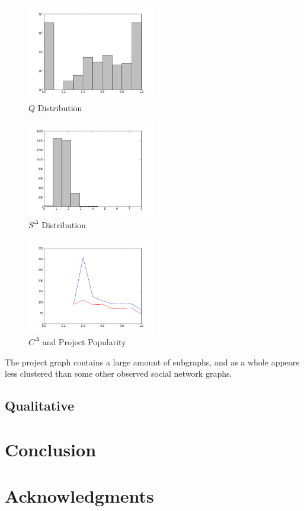 \documentclass{proc}
\begin{document}
\begin{figure}
\label{fig:q_distribution}
\begin{center}
\caption{$Q$ Distribution}
\includegraphics[width=0.5\textwidth]{images/freecode-q-histo.png}
\end{center}
\end{figure}

\begin{figure}
\begin{center}
\caption{$S^\Delta$ Distribution}
\includegraphics[width=0.5\textwidth]{images/freecode-smallworld-histo.png}
\end{center}
\end{figure}

\begin{figure}
\begin{center}
\caption{$C^\Delta$ and Project Popularity}
\includegraphics[width=0.5\textwidth]{images/freecode-graph.png}
\end{center}
\end{figure}

The project graph contains a large amount of subgraphs, and as a whole appears less clustered than some other observed social network graphs\cite{madey2002open}.

\subsection{Qualitative}

\section{Conclusion}


\section{Acknowledgments}



\end{document}
